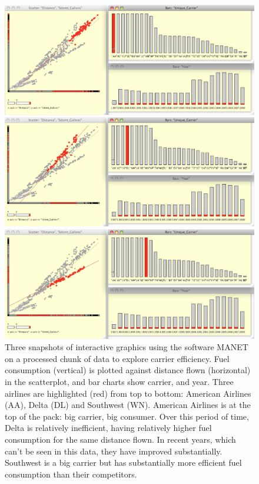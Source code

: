 \documentclass{article}
\begin{document}
\begin{figure}[p]
\centerline{\includegraphics[width=5in]{images/airline-manet1.png}}
\smallskip
\centerline{\includegraphics[width=5in]{images/airline-manet2.png}}
\smallskip
\centerline{\includegraphics[width=5in]{images/airline-manet3.png}}
\caption{Three snapshots of interactive graphics using the software MANET on a processed chunk of data to explore carrier efficiency. Fuel consumption (vertical) is plotted against distance flown (horizontal) in the scatterplot, and bar charts show carrier, and year. Three airlines are highlighted (red) from top to bottom: American Airlines (AA), Delta (DL) and Southwest (WN). American Airlines is at the top of the pack: big carrier, big consumer. Over this period of time, Delta is relatively inefficient, having relatively higher fuel consumption for the same distance flown. In recent years, which can't be seen in this data, they have improved substantially. Southwest is a big carrier but has substantially more efficient fuel consumption than their competitors.}
\label{carrier-efficiency}
\end{figure}
\end{document}
